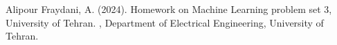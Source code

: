 \documentclass[DIV=calc, paper=a4, fontsize=11pt, twocolumn]{scrartcl}	 %
\begin{document}

\begin{thebibliography}{99} %

  Alipour Fraydani, A. (2024).
  \newblock Homework on Machine Learning problem set 3, University of Tehran.
  , Department of Electrical Engineering, University of Tehran.
  
\end{thebibliography}

\end{document}
